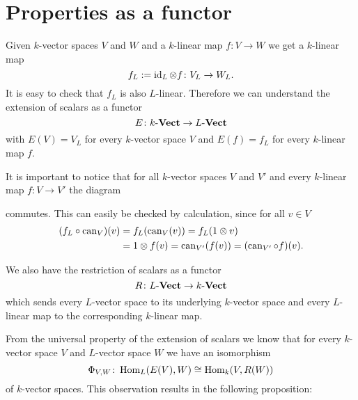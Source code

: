\section{Properties as a functor}


Given $k$-vector spaces $V$ and $W$ and a $k$-linear map $f \colon V \to W$ we get a $k$-linear map
\[
 f_L := \operatorname{id}_L \otimes f \colon V_L \to W_L.
\]
It is easy to check that $f_L$ is also $L$-linear. Therefore we can understand the extension of scalars as a functor
\[
 E \colon k\text{-}\mathbf{Vect} \to L\text{-}\mathbf{Vect}
\]
with $E(V) = V_L$ for every $k$-vector space $V$ and $E(f) = f_L$ for every $k$-linear map $f$.

It is important to notice that for all $k$-vector spaces $V$ and $V'$ and every $k$-linear map $f \colon V \to V'$ the diagram
\begin{center}
\end{center}
commutes. This can easily be checked by calculation, since for all $v \in V$
\begin{align*}
 (f_L \circ \operatorname{can}_V)(v)
 &= f_L(\operatorname{can}_V(v))
 = f_L(1 \otimes v) \\
 &= 1 \otimes f(v)
 = \operatorname{can}_{V'}(f(v))
 = (\operatorname{can}_{V'} \circ f)(v).
\end{align*}

We also have the restriction of scalars as a functor
\[
 R \colon L\text{-}\mathbf{Vect} \to k\text{-}\mathbf{Vect}
\]
which sends every $L$-vector space to its underlying $k$-vector space and every $L$-linear map to the corresponding $k$-linear map.
 
From the universal property of the extension of scalars we know that for every $k$-vector space $V$ and $L$-vector space $W$ we have an isomorphism
\[
 \Phi_{V,W} \colon \operatorname{Hom}_L(E(V),W) \cong \operatorname{Hom}_k(V,R(W))
\]
of $k$-vector spaces. This observation results in the following proposition:
 
